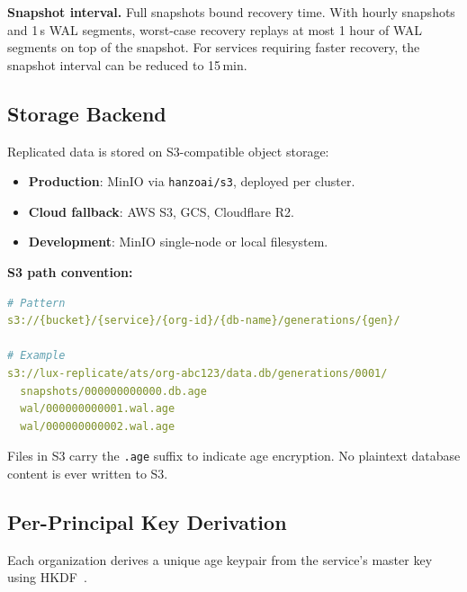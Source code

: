 \documentclass[11pt,a4paper]{article}
\begin{document}
\noindent\textbf{Snapshot interval.} Full snapshots bound recovery
time. With hourly snapshots and 1\,s WAL segments, worst-case recovery
replays at most 1 hour of WAL segments on top of the snapshot. For
services requiring faster recovery, the snapshot interval can be
reduced to 15\,min.

\subsection{Storage Backend}\label{sec:storage}

Replicated data is stored on S3-compatible object storage:

\begin{itemize}[nosep]
  \item \textbf{Production}: MinIO via \texttt{hanzoai/s3}, deployed
    per cluster.
  \item \textbf{Cloud fallback}: AWS S3, GCS, Cloudflare R2.
  \item \textbf{Development}: MinIO single-node or local filesystem.
\end{itemize}

\noindent\textbf{S3 path convention:}

\begin{lstlisting}[language=YAML,caption={S3 path structure.}]
# Pattern
s3://{bucket}/{service}/{org-id}/{db-name}/generations/{gen}/

# Example
s3://lux-replicate/ats/org-abc123/data.db/generations/0001/
  snapshots/000000000000.db.age
  wal/000000000001.wal.age
  wal/000000000002.wal.age
\end{lstlisting}

Files in S3 carry the \texttt{.age} suffix to indicate age encryption.
No plaintext database content is ever written to S3.

\subsection{Per-Principal Key Derivation}\label{sec:keys}

Each organization derives a unique age keypair from the service's
master key using HKDF~\cite{rfc5869}.
\end{document}
